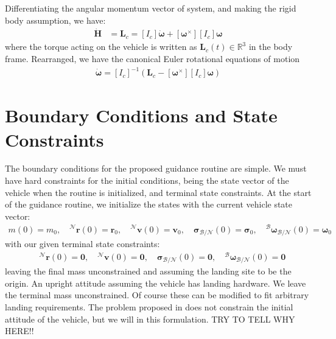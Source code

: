 Differentiating the angular momentum vector of system, and making the rigid body assumption, we have:
\begin{align}
\dot{\bm{H}} &= \mathbf{L}_c = [I_c]\dot{\boldsymbol{\omega}} + [\boldsymbol{\omega}^\times][I_c]\boldsymbol{\omega}
\end{align}
where the torque acting on the vehicle is written as $\mathbf{L}_c(t) \in \mathbb{R}^3$ in the body frame. Rearranged, we have the canonical Euler rotational equations of motion
\begin{align}
	\dot{\boldsymbol{\omega}} = [I_c]^{-1}(\mathbf{L}_c - [\boldsymbol{\omega}^\times][I_c]\boldsymbol{\omega})
\end{align}


\section{Boundary Conditions and State Constraints}
The boundary conditions for the proposed guidance routine are simple. We must have hard constraints for the initial conditions, being the state vector of the vehicle when the routine is initialized, and terminal state constraints. At the start of the guidance routine, we initialize the states with the current vehicle state vector:
\begin{align}
	m(0) = m_0, \quad ^\mathcal{N}\mathbf{r}(0) = \mathbf{r}_0, \quad ^\mathcal{N}\mathbf{v}(0) = \mathbf{v}_0, \quad \boldsymbol{\sigma}_\mathcal{B/N}(0) = \boldsymbol{\sigma}_0, \quad  ^\mathcal{B}\boldsymbol{\omega}_\mathcal{B/N}(0) = \boldsymbol{\omega}_0
\end{align}
with our given terminal state constraints:
\begin{align}
	\quad ^\mathcal{N}\mathbf{r}(0) = \mathbf{0}, \quad ^\mathcal{N}\mathbf{v}(0) = \mathbf{0}, \quad \boldsymbol{\sigma}_\mathcal{B/N}(0) = \mathbf{0}, \quad  ^\mathcal{B}\boldsymbol{\omega}_\mathcal{B/N}(0) = \mathbf{0}
\end{align}
leaving the final mass unconstrained and assuming the landing site to be the origin. An upright attitude assuming the vehicle has landing hardware. We leave the terminal mass unconstrained. Of course these can be modified to fit arbitrary landing requirements. The problem proposed in \cite{szmuk2018successive} does not constrain the initial attitude of the vehicle, but we will in this formulation. TRY TO TELL WHY HERE!!

